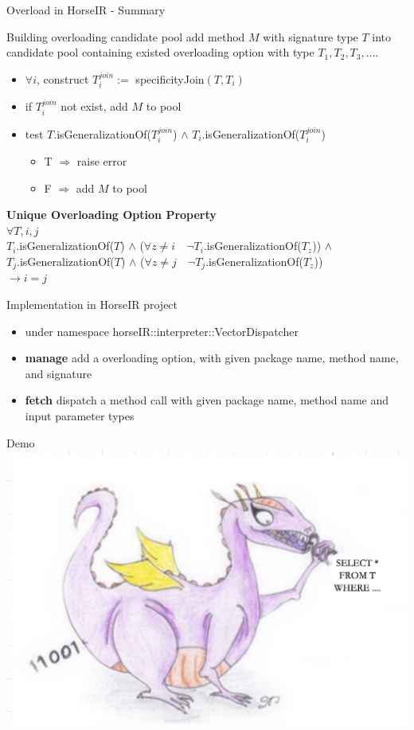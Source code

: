 \documentclass{beamer}
\begin{document}
\begin{frame}{Overload in HorseIR - Summary}
\begin{block}{Building overloading candidate pool}
add method $M$ with signature type $T$ into candidate pool containing existed
overloading option with type $T_1, T_2, T_3, \dots$.
\begin{itemize}
    \item $\forall i$, construct $T_i^{join} :=$ specificityJoin$(T, T_i)$
    \item if $T_i^{join}$ not exist, add $M$ to pool
    \item test $T$.isGeneralizationOf($T_i^{join}$) $\land$
               $T_i$.isGeneralizationOf($T_i^{join}$)
          \begin{itemize}
          \item T $\Rightarrow$ raise error
          \item F $\Rightarrow$ add $M$ to pool
          \end{itemize}
\end{itemize}
\end{block}
\textbf{Unique Overloading Option Property} \\
$\forall T,i,j$ \\
$T_i$.isGeneralizationOf($T$) $\land$  
($\forall z\neq i \quad \neg T_i$.isGeneralizationOf($T_z$)) $\land$ \\
$T_j$.isGeneralizationOf($T$) $\land$  
($\forall z\neq j \quad \neg T_j$.isGeneralizationOf($T_z$))         \\
$\rightarrow i = j$
\end{frame}

\begin{frame}{Implementation in HorseIR project}
\begin{itemize}
    \item under namespace horseIR::interpreter::VectorDispatcher
    \item \textbf{manage} add a overloading option, with given package name, 
          method name, and signature
    \item \textbf{fetch} dispatch a method call with given package name, method
          name and input parameter types
\end{itemize}
\end{frame}

\begin{frame}{Demo}
\includegraphics[width=\textwidth]{logo-dragon}
\end{frame}
\end{document}
